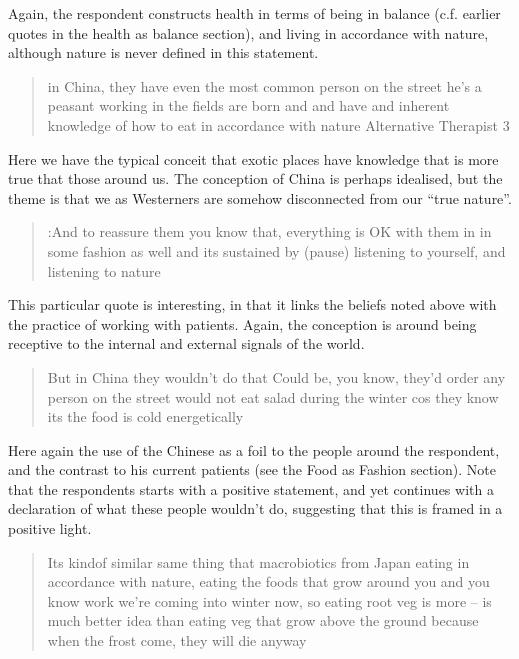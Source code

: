 Again, the respondent constructs health in terms of being in balance (c.f. earlier quotes in the health as balance section),  and living in accordance with nature, although nature is never defined in this statement. 

\begin{quotation}
   in China, they have even the most common person on the street he's a peasant working in the fields are born and and have and inherent knowledge of how to eat in accordance with nature 
Alternative Therapist 3
\end{quotation}

Here we have the typical conceit that exotic places have knowledge that is more true that those around us. The conception of China is perhaps idealised, but the theme is that we as Westerners are somehow disconnected from our ``true nature''. 

\begin{quotation}
  :And to reassure them you know that, everything is OK with them in in some fashion as well and its sustained by (pause) listening to yourself, and listening to nature

\end{quotation}

This particular quote is interesting, in that it links the beliefs noted above with the practice of working with patients. Again, the conception is around being receptive to the internal and external signals of the world. 

\begin{quotation}
  But in China they wouldn't do that Could be, you know, they'd order any person on the street would not eat salad during the winter cos they know its the food is cold energetically 

\end{quotation}

Here again the use of the Chinese as a foil to the people around the respondent, and the contrast to his current patients (see the Food as Fashion section). Note that the respondents starts with a positive statement, and yet continues with a declaration of what these people wouldn't do, suggesting that this is framed in a positive light. 

\begin{quotation}
  Its kindof similar same thing that macrobiotics from Japan eating in accordance with nature, eating the foods that grow around you and you know work we're coming into winter now, so eating root veg is more – is much better idea than eating veg that grow above the ground because when the frost come, they will die anyway

\end{quotation}

